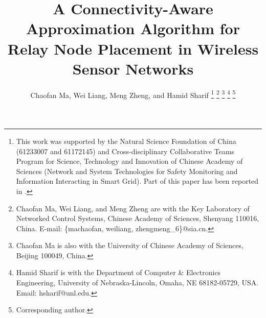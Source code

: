 \documentclass[journal]{IEEEtran}
\begin{document}
\title{A Connectivity-Aware Approximation Algorithm for Relay Node Placement in Wireless Sensor Networks}

\author{Chaofan Ma,
        Wei Liang,
        Meng Zheng, and Hamid Sharif
\thanks{This work was supported by the Natural Science Foundation of China (61233007 and 61172145) and Cross-disciplinary Collaborative Teams Program for Science, Technology and Innovation of Chinese Academy of Sciences (Network and System Technologies for Safety Monitoring and Information Interacting in Smart Grid). Part of this paper has been reported in \cite{Ma15}.}
\thanks{Chaofan Ma, Wei Liang, and Meng Zheng are with the Key Laboratory of Networked Control Systems, Chinese Academy of Sciences, Shenyang 110016, China. E-mail: \{machaofan, weiliang, zhengmeng\_6\}@sia.cn.}
\thanks{Chaofan Ma is also with the University of Chinese Academy of Sciences, Beijing 100049, China.}
\thanks{Hamid Sharif is with the Department of Computer \& Electronics Engineering, University of Nebraska-Lincoln, Omaha, NE 68182-05729, USA. Email: hsharif@unl.edu.}
\thanks{ Corresponding author.}}















\maketitle
\end{document}
